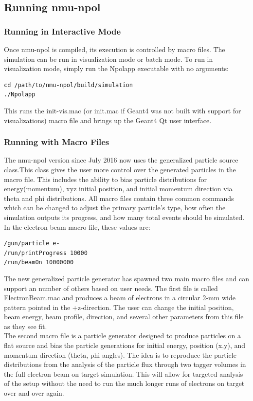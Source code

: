 \documentclass[10pt,titlepage]{article}
\begin{document}
\subsection{Running nmu-npol}
\subsubsection{Running in Interactive Mode}
Once nmu-npol is compiled, its execution is controlled by macro files.  The simulation can be run in visualization mode or batch mode.  To run in visualization mode, simply run the Npolapp executable with no arguments:
\begin{lstlisting}[frame=single]
cd /path/to/nmu-npol/build/simulation
./Npolapp
\end{lstlisting}
This runs the init-vis.mac (or init.mac if Geant4 was not built with support for visualizations) macro file and brings up the Geant4 Qt user interface. \\

\subsubsection{Running with Macro Files}
The nmu-npol version since July 2016 now uses the generalized particle source class.This class gives the user more control over the generated particles in the macro file.  This includes the ability to bias particle distributions for energy(momentum), xyz initial position, and initial momentum direction via theta and phi distributions. All macro files contain three common commands which can be changed to adjust the primary particle's type, how often the simulation outputs its progress, and how many total events should be simulated.  In the electron beam macro file, these values are:
\begin{lstlisting}[frame=single]
/gun/particle e-
/run/printProgress 10000
/run/beamOn 10000000
\end{lstlisting}

The new generalized particle generator has spawned two main macro files and can support an number of others based on user needs.  The first file is called ElectronBeam.mac and produces a beam of electrons in a circular 2-mm wide pattern pointed in the +z-direction. The user can change the initial position, beam energy, beam profile, direction, and several other parameters from this file as they see fit. \\

The second macro file is a particle generator designed to produce particles on a flat source and bias the particle generations for initial energy, position (x,y), and momentum direction (theta, phi angles).  The idea is to reproduce the particle distributions from the analysis of the particle flux through two tagger volumes in the full electron beam on target simulation.  This will allow for targeted analysis of the setup without the need to run the much longer runs of electrons on target over and over again. \\
\end{document}
